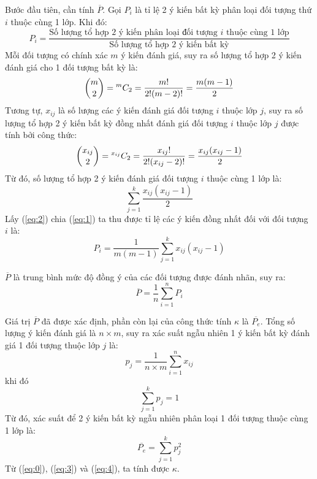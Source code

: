 Bước đầu tiên, cần tính $\overline{P}$. Gọi $P_i$ là tỉ lệ 2 ý kiến bất kỳ phân loại đối tượng thứ $i$ thuộc cùng 1 lớp. Khi đó:
$$P_i = \dfrac{\text{Số lượng tổ hợp 2 ý kiến phân loại đối tượng } i \text{ thuộc cùng 1 lớp}}{\text{Số lượng tổ hợp 2 ý kiến bất kỳ}}$$
Mỗi đối tượng có chính xác $m$ ý kiến đánh giá, suy ra số lượng tổ hợp 2 ý kiến đánh giá cho 1 đối tượng bất kỳ là:
\begin{equation}\label{eq:1}
\binom m2={}^{m}C_{2}=\frac{m!}{2!(m-2)!} = \dfrac{m(m-1)}{2}
\end{equation}
Tương tự, $x_{ij}$ là số lượng các ý kiến đánh giá đối tượng $i$ thuộc lớp $j$, suy ra số lượng tổ hợp 2 ý kiến bất kỳ đồng nhất đánh giá đối tượng $i$ thuộc lớp $j$ được tính bởi công thức:
$$\binom {x_{ij}}2={}^{x_{ij}}C_{2}=\frac{x_{ij}!}{2!(x_{ij}-2)!} = \dfrac{x_{ij}(x_{ij}-1)}{2}$$
Từ đó, số lượng tổ hợp 2 ý kiến đánh giá đối tượng $i$ thuộc cùng 1 lớp là:
\begin{equation}\label{eq:2}
\sum_{j=1}^{k}\dfrac{x_{ij}(x_{ij}-1)}{2}
\end{equation}
Lấy (\ref{eq:2}) chia (\ref{eq:1}) ta thu được tỉ lệ các ý kiến đồng nhất đối với đối tượng $i$ là:
$$P_i = \dfrac{1}{m(m-1)}\sum_{j=1}^{k}x_{ij}(x_{ij}-1)$$

$\overline{P}$ là trung bình mức độ đồng ý của các đối tượng được đánh nhãn, suy ra:
\begin{equation} \label{eq:3}
\overline{P} = \dfrac{1}{n}\sum_{i=1}^{n}P_i
\end{equation}

Giá trị $\overline{P}$ đã được xác định, phần còn lại của công thức tính $\kappa$ là $\overline{P_e}$. Tổng số lượng ý kiến đánh giá là $n \times m$, suy ra xác suất ngẫu nhiên 1 ý kiến bất kỳ đánh giá 1 đối tượng thuộc lớp $j$ là:
$$p_j = \dfrac{1}{n \times m} \sum_{i=1}^{n} x_{ij}$$ khi đó $$\sum_{j=1}^{k} p_j=1$$
Từ đó, xác suất để 2 ý kiến bất kỳ ngẫu nhiên phân loại 1 đối tượng thuộc cùng 1 lớp là:
\begin{equation}\label{eq:4}
\overline{P_e} = \sum_{j=1}^{k}p_j^{2}
\end{equation}
Từ (\ref{eq:0}), (\ref{eq:3}) và (\ref{eq:4}), ta tính được $\kappa$.\\

